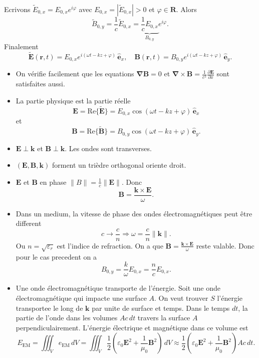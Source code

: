Ecrivons $\tilde{E}_{0,x}=E_{0,x}e^{ i\varphi}$ avec $E_{0,x}=|\tilde{E}_{0,x}|>0$ et $\varphi \in \mathbf{R}$. Alors
$$
\tilde{B}_{0,y}=\frac{1}{c}\tilde{E}_{0,x}=\underbrace{ \frac{1}{c}E_{0,x} }_{ B_{0,y} }e^{ i\varphi }.
$$
Finalement
$$
\boldsymbol{\tilde{E}}(\boldsymbol{r},t)=E_{0,x}e^{ i(\omega t-kz+\varphi) }\,\boldsymbol{\hat{e}}_{x}, \quad \boldsymbol{B}(\boldsymbol{r},t)=B_{0,y}e^{ i(\omega t-kz+\varphi) }\,\boldsymbol{\hat{e}}_{y}.
$$
\begin{itemize}
\item On vérifie facilement que les equations $\boldsymbol{\nabla B}=0$ et $\boldsymbol{\nabla}\times \boldsymbol{B}=\frac{1}{c^{2}}\frac{ \partial \boldsymbol{E} }{ \partial x }$ sont satisfaites aussi. 
\item La partie physique est la partie réelle
$$
\boldsymbol{E}=\mathrm{Re}\{ \boldsymbol{\tilde{E}} \}=E_{0,x}\cos(\omega t-kz+\varphi)\,\boldsymbol{\hat{e}}_{x}
$$
et
$$
\boldsymbol{B}=\mathrm{Re}\{ \boldsymbol{\tilde{B}} \}=B_{0,y}\cos(\omega t-kz+\varphi)\,\boldsymbol{\hat{e}}_{y}.
$$
\item $\boldsymbol{E}\perp \boldsymbol{k}$ et $\boldsymbol{B}\perp \boldsymbol{k}$. Les ondes sont transverses.
\item $(\boldsymbol{E},\boldsymbol{B},\boldsymbol{k})$ forment un trièdre orthogonal oriente droit. 
\item $\boldsymbol{E}$ et $\boldsymbol{B}$ en phase $\lVert B \rVert=\frac{1}{c}\lVert \boldsymbol{E} \rVert$. Donc
$$
\boldsymbol{B}=\frac{\boldsymbol{k}\times \boldsymbol{E}}{\omega}.
$$
\item Dans un medium, la vitesse de phase des ondes électromagnétiques peut être different
$$
c \to \frac{c}{n} \Rightarrow \omega=\frac{c}{n}\lVert \boldsymbol{k} \rVert .
$$
Ou $n=\sqrt{ \varepsilon _{r} }$ est l'indice de refraction. On a que $\boldsymbol{B}=\frac{\boldsymbol{k}\times \boldsymbol{E}}{\omega}$ reste valable. Donc pour le cas precedent on a 
$$
B_{0,y}=\frac{k}{\omega}E_{0,x}=\frac{n}{c}E_{0,x}.
$$
\item Une onde électromagnétique transporte de l'énergie. Soit une onde électromagnétique qui impacte une surface $A$. On veut trouver $S$ l'énergie transportee le long de $\boldsymbol{k}$ par unite de surface et temps. 
Dans le temps $dt$, la partie de l'onde dans les volumes $Ac\,dt$ travers la surface $A$ perpendiculairement. L'énergie électrique et magnétique dans ce volume est
$$
E_{\mathrm{EM}}=\iiint _{V}e_{\mathrm{EM}}\,dV=\iiint _{V} \frac{1}{2}\left( \varepsilon_{0}\boldsymbol{E}^{2}+\frac{1}{\mu_{0}}\boldsymbol{B}^{2} \right)\,dV \approx \frac{1}{2}\left( \varepsilon_{0}\boldsymbol{E}^{2}+\frac{1}{\mu_{0}}\boldsymbol{B}^{2} \right)Ac\,dt.
$$
\end{itemize}
